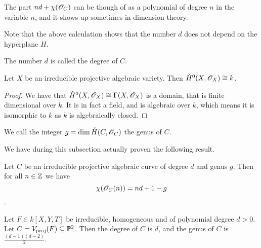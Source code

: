 The part $nd + \chi(\mathscr{O}_C)$ can be though of as a polynomial of degree $n$ in the variable $n$, and it shows up sometimes in dimension theory. 

Note that the above calculation shows that the number $d$ does not depend on the hyperplane $H$. 

\begin{definition}
The number $d$ is called the degree of $C$. 
\end{definition}

\begin{lemma}
Let $X$ be an irreducible projective algebraic variety. Then $\check{H}^0(X,\mathscr{O}_X)\cong k$. 
\end{lemma}
\begin{proof}
We have that $\check{H}^0(X, \mathscr{O}_X) \cong \Gamma(X, \mathscr{O}_X)$ is a domain, that is finite dimensional over $k$. It is in fact a field, and is algebraic over $k$, which means it is isomorphic to $k$ as $k$ is algebraically closed. 
\end{proof}

\begin{definition}
We call the integer $g = \dim \check{H}(C, \mathscr{O}_C)$ the genus of $C$. 
\end{definition}

We have during this subsection actually proven the following result. 

\begin{theorem}
Let $C$ be an irreducible projective algebraic curve of degree $d$ and genus $g$. Then for all $n\in \mathbb{Z}$ we have 
$$\chi(\mathscr{O}_C(n)) = nd + 1-g$$. 
\end{theorem}

\begin{example}
Let $F\in k[X, Y, T]$ be irreducible, homogeneous and of polynomial degree $d>0$. Let $C = V_{\text{proj}}(F) \subseteq \mathbb{P}^2$. Then the degree of $C$ is $d$, and the genus of $C$ is $\frac{(d-1)(d-2)}{2}$.  
\end{example}